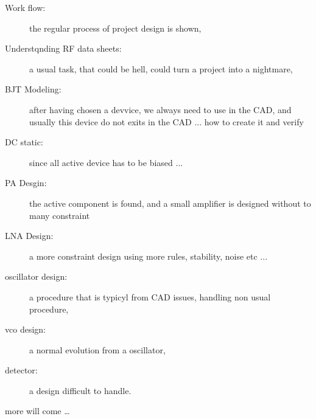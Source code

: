 \begin{description}
\item[Work flow: ] the regular process of project design is shown,

\item[Understqnding RF data sheets: ] a usual task, that could be hell, could turn a project into a nightmare,

\item[BJT Modeling: ] after having chosen a devvice, we always need to use in the CAD, and usually this device do not exits in the CAD ... how to create it and verify

\item[DC static: ] since all active device has to be biased ...

\item[PA Desgin: ] the active component is found, and a small amplifier is designed without to many constraint

\item[LNA Design: ] a more constraint design using more rules, stability, noise etc ...

\item[oscillator design: ] a procedure that is typicyl from CAD issues, handling non usual procedure,

\item[vco design: ] a normal evolution from a oscillator,

\item[detector: ] a design difficult to handle.

\item[more will come \ldots]

\end{description}
